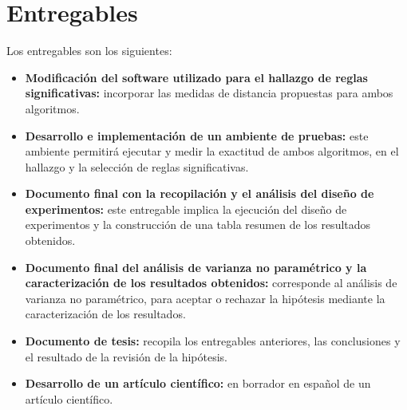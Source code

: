 \section{\textbf{Entregables}}
Los entregables son los siguientes:
\begin{itemize}
\item \textbf{Modificaci\'on del software utilizado para el hallazgo de reglas significativas:} incorporar las medidas de distancia propuestas para ambos algoritmos.
\item \textbf{Desarrollo e implementaci\'on de un ambiente de pruebas:} este ambiente permitir\'a ejecutar y medir la exactitud de ambos algoritmos, en el hallazgo y la selecci\'on de reglas significativas.
\item \textbf{Documento final con la recopilaci\'on y el an\'alisis del dise\~no de experi\-mentos:} este entregable implica la ejecuci\'on del dise\~no de experimentos y la construcci\'on de una tabla resumen de los resultados obtenidos. 
\item \textbf{Documento final del an\'alisis de varianza no param\'etrico y la caracterizaci\'on de los resultados obtenidos:} corresponde al an\'alisis de varianza no param\'etrico, para aceptar o rechazar la hip\'otesis mediante la caracterizaci\'on de los resultados.
\item \textbf{Documento de tesis:} recopila los entregables anteriores, las conclusiones y el resultado de la revisi\'on de la hip\'otesis.
\item \textbf{Desarrollo de un art\'iculo cient\'ifico:} en borrador en espa\~nol de un art\'iculo cient\'ifico.
\end{itemize}
